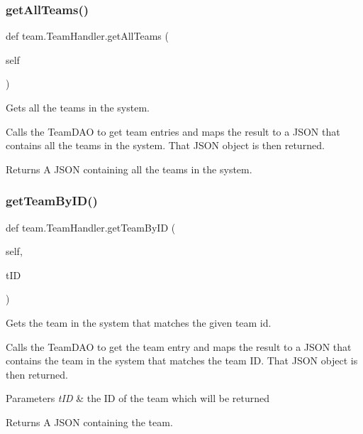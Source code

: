 \subsubsection{\texorpdfstring{get\+All\+Teams()}{getAllTeams()}}
{\footnotesize\ttfamily def team.\+Team\+Handler.\+get\+All\+Teams (\begin{DoxyParamCaption}\item[{}]{self }\end{DoxyParamCaption})}



Gets all the teams in the system. 

Calls the Team\+D\+AO to get team entries and maps the result to a J\+S\+ON that contains all the teams in the system. That J\+S\+ON object is then returned.

\begin{DoxyReturn}{Returns}
A J\+S\+ON containing all the teams in the system. 
\end{DoxyReturn}
\mbox{\label{classteam_1_1_team_handler_a74614e57b5de837cd73ebebb2fd68d7e}} 
\subsubsection{\texorpdfstring{get\+Team\+By\+I\+D()}{getTeamByID()}}
{\footnotesize\ttfamily def team.\+Team\+Handler.\+get\+Team\+By\+ID (\begin{DoxyParamCaption}\item[{}]{self,  }\item[{}]{t\+ID }\end{DoxyParamCaption})}



Gets the team in the system that matches the given team id. 

Calls the Team\+D\+AO to get the team entry and maps the result to a J\+S\+ON that contains the team in the system that matches the team ID. That J\+S\+ON object is then returned.


\begin{DoxyParams}{Parameters}
{\em t\+ID} & the ID of the team which will be returned\\
\hline
\end{DoxyParams}
\begin{DoxyReturn}{Returns}
A J\+S\+ON containing the team. 
\end{DoxyReturn}
\mbox{\label{classteam_1_1_team_handler_a130f48624c706c192f45929e26df86e4}} 
